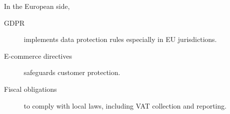 In the European side,

\begin{description}
	\item[GDPR] implements data protection rules especially in EU jurisdictions.
	\item[E-commerce directives] safeguards customer protection.
	\item[Fiscal obligations] to comply with local laws, including VAT collection and reporting.
\end{description}

\clearpage